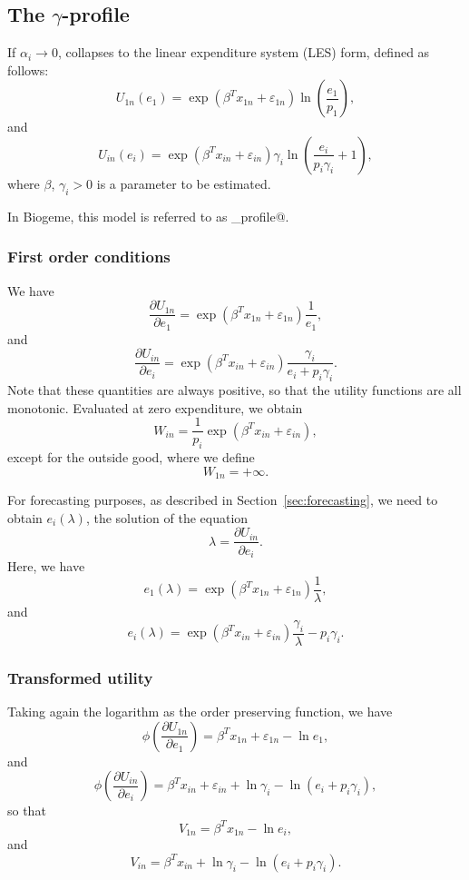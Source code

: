 \documentclass[12pt,a4paper]{article}
\begin{document}
\subsection{The $\gamma$-profile}
If $\alpha_i \to 0$,  collapses to the linear expenditure system (LES) form, defined as follows:
\begin{equation}
  \label{eq:u_les_outside}
U_{1n}(e_{1})= \exp(\beta^T x_{1n} + \varepsilon_{1n}) \ln \left(\frac{e_1}{p_1} \right),
\end{equation}
and
\begin{equation}
  \label{eq:u_les}
U_{in}(e_{i})= \exp(\beta^T x_{in} + \varepsilon_{in}) \gamma_i \ln \left(\frac{e_i}{p_i \gamma_i}+1 \right),
\end{equation}
where $\beta$, $\gamma_i > 0$ is a  parameter to be
estimated.

In Biogeme, this model is referred to as \lstinline@gamma_profile@.
\subsubsection*{First order conditions}
We have
\[
\frac{\partial U_{1n}}{\partial e_1} =  \exp(\beta^T x_{1n} + \varepsilon_{1n}) \frac{1}{e_1},
\]
and
\[
\frac{\partial U_{in}}{\partial e_i} =  \exp(\beta^T x_{in} + \varepsilon_{in}) \frac{\gamma_i}{e_i + p_i \gamma_i}.
\]
Note that these quantities are always positive, so that the utility functions are all monotonic.
Evaluated at zero expenditure, we obtain
\[
    W_{in} =  \frac{1}{p_i}\exp(\beta^T x_{in} + \varepsilon_{in}),
\]
except for the outside good, where we define
\[
    W_{1n} = +\infty.
\]

For forecasting purposes, as described in Section~\ref{sec:forecasting}, we need to obtain $e_i(\lambda)$, the solution of the equation
\[\lambda = \frac{\partial U_{in}}{\partial e_i}. \]
Here, we have
\begin{equation}
    \label{eq:gamma_optimal_outside}
   e_1(\lambda) = \exp(\beta^T x_{1n} + \varepsilon_{1n}) \frac{1}{\lambda},
\end{equation}
and
\begin{equation}
    \label{eq:gamma_optimal}
  e_i(\lambda) = \exp(\beta^T x_{in} + \varepsilon_{in}) \frac{\gamma_i}{\lambda } -p_i \gamma_i.
 \end{equation}

\subsubsection*{Transformed utility}
Taking again the logarithm as the order preserving function, we have
\[
\phi\left(\frac{\partial U_{1n}}{\partial e_1}\right) =\beta^T x_{1n} + \varepsilon_{1n} - \ln e_1,
\]
and
\[
\phi\left(\frac{\partial U_{in}}{\partial e_i}\right) =\beta^T x_{in} + \varepsilon_{in} + \ln \gamma_i - \ln(e_i + p_i \gamma_i),
\]
so that
\[
V_{1n} = \beta^T x_{1n}  - \ln e_i,
\]
and
\[
V_{in} = \beta^T x_{in} + \ln \gamma_i - \ln(e_i + p_i \gamma_i).
\]
\end{document}

